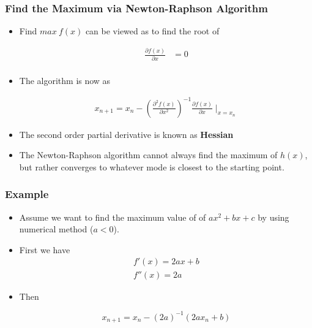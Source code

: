 \documentclass[10pt]{beamer}
\begin{document}
\begin{frame}
  \frametitle{Find the Maximum via Newton-Raphson Algorithm}

  \begin{itemize}

  \item Find $max~ f(x)$ can be viewed as to find the root of

      \begin{align*}
      \frac{\partial f(x)}{\partial x} & =0\\
      \end{align*}

    \item The algorithm is now as

      \begin{align*}
        x_{n+1} = x_n - \left( \frac{\partial ^2 f(x)}{\partial x^2}
           \right)^{-1} \frac{\partial f(x)}{\partial x} \mid_{x=x_n}
      \end{align*}

    \item The second order partial derivative is known as \textbf{Hessian}

  \item The Newton-Raphson algorithm cannot always find the maximum of
    $h(x)$, but rather converges to whatever mode is closest to the
      starting point.
  \end{itemize}
\end{frame}



\begin{frame}
  \frametitle{Example}

  \begin{itemize}
  \item Assume we want to find the maximum value of of $ax^2+bx+c$ by using
    numerical method ($a<0$).

  \item First we have
    \begin{align*}
      f'(x) = 2ax + b\\
      f''(x) = 2a
    \end{align*}

  \item Then

    \begin{equation*}
        x_{n+1} = x_n - \left( 2a \right)^{-1} (2ax_n+b)
    \end{equation*}

  \end{itemize}

\end{frame}
\end{document}
